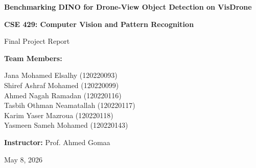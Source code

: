 \documentclass[11pt, conference, onecolumn]{IEEEtran}
\begin{document}
\begin{titlepage}
    \centering
    \vspace*{1.5in}
    
    {\Huge \bfseries Benchmarking DINO for Drone-View Object Detection on VisDrone\par}
    
    \vspace{1.5in}
    
    {\LARGE \textbf{CSE 429: Computer Vision and Pattern Recognition}\par}
    {\Large Final Project Report\par}
    
    \vspace{1.5in}
    
    {\large \textbf{Team Members:}\par}
    \vspace{0.2in}
    {\large 
    Jana Mohamed Elsalhy (120220093) \\
    Shiref Ashraf Mohamed (120220099) \\
    Ahmed Nagah Ramadan (120220116) \\
    Tasbih Othman Neamatallah (120220117) \\
    Karim Yaser Mazroua (120220118) \\
    Yasmeen Sameh Mohamed (120220143) \par}
    
    \vfill
    
    {\Large \textbf{Instructor:} Prof. Ahmed Gomaa\par}
    \vspace{0.3in}
    {\large May 8, 2026\par}
\end{titlepage}


\begin{abstract}
The rapid proliferation of Unmanned Aerial Vehicles (UAVs) has intensified the demand for robust, high-precision aerial object detection systems. However, standard convolutional and transformer-based architectures often struggle in the drone domain due to extreme scale variations, high object density, and severe background clutter. In this project, we implement and benchmark the state-of-the-art DINO (DETR with Improved DeNoising Anchor Boxes) model against the industry-standard YOLOv11 and a standard DETR baseline. Utilizing the VisDrone-DET2019 dataset, we evaluate the efficacy of Contrastive DeNoising (CDN) and anchor-free transformer logic in overcoming bipartite matching instability for small-scale targets. Due to the extreme computational requirements of training multi-scale transformers from scratch, our methodology focuses on a comparative review and evaluation of these models. Our experiments reveal the critical trade-offs between the end-to-end global reasoning of transformers and the high-speed inference of CNNs for edge deployment.
\end{abstract}
\end{document}

